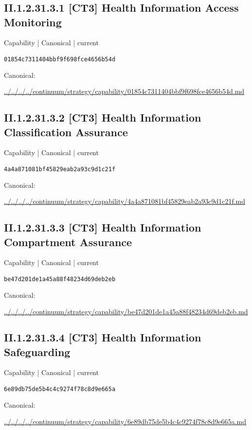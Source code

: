 \documentclass[10pt,a4paper]{article}
\begin{document}
\subsection*{II.1.2.31.3.1 [CT3] Health Information Access Monitoring}
{\small Capability | Canonical | current}\par
\texttt{01854c7311404bbf9f698fce4656b54d}\par
Canonical: \par
{\footnotesize\url{../../../../continuum/strategy/capability/01854c7311404bbf9f698fce4656b54d.md}}\par
\subsection*{II.1.2.31.3.2 [CT3] Health Information Classification Assurance}
{\small Capability | Canonical | current}\par
\texttt{4a4a871081bf45829eab2a93c9d1c21f}\par
Canonical: \par
{\footnotesize\url{../../../../continuum/strategy/capability/4a4a871081bf45829eab2a93c9d1c21f.md}}\par
\subsection*{II.1.2.31.3.3 [CT3] Health Information Compartment Assurance}
{\small Capability | Canonical | current}\par
\texttt{be47d201de1a45a88f48234d69deb2eb}\par
Canonical: \par
{\footnotesize\url{../../../../continuum/strategy/capability/be47d201de1a45a88f48234d69deb2eb.md}}\par
\subsection*{II.1.2.31.3.4 [CT3] Health Information Safeguarding}
{\small Capability | Canonical | current}\par
\texttt{6e89db75de5b4c4c9274f78c8d9e665a}\par
Canonical: \par
{\footnotesize\url{../../../../continuum/strategy/capability/6e89db75de5b4c4c9274f78c8d9e665a.md}}\par
\end{document}

